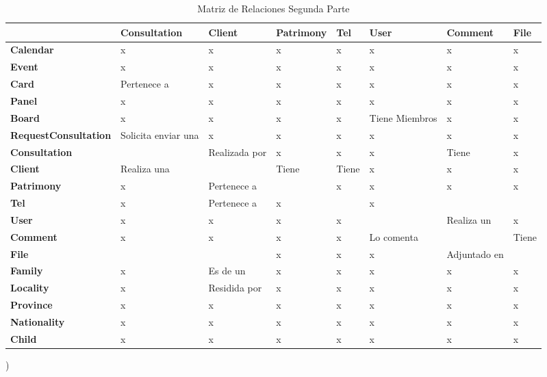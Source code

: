         
\begin{sidewaystable}[p]
    \centering
        \begin{tabular}{|p{4.1cm}|*{7}{>{\raggedright\arraybackslash}p{2.5cm}|}}
         \hline
         & \textbf{Consultation} & \textbf{Client} & \textbf{Patrimony} & \textbf{Tel} & \textbf{User} & \textbf{Comment} & \textbf{File} \\
         \hline
        \textbf{Calendar} & x & x & x & x & x & x & x \\
         \hline
        \textbf{Event} & x & x & x & x & x & x & x \\
         \hline
        \textbf{Card}  & Pertenece a & x & x & x & x & x & x \\
         \hline
        \textbf{Panel}  & x & x & x & x & x & x & x \\
         \hline
        \textbf{Board}  & x & x & x & x & Tiene Miembros & x & x \\
         \hline
        \textbf{RequestConsultation} &  Solicita enviar una & x & x & x & x & x & x \\
         \hline
        \textbf{Consultation} & \cellcolor{gray!25} & Realizada por & x & x & x & Tiene & x \\
         \hline
        \textbf{Client}  & Realiza una & \cellcolor{gray!25} & Tiene & Tiene & x & x & x \\
         \hline
        \textbf{Patrimony}  & x & Pertenece a & \cellcolor{gray!25} & x & x & x & x \\
         \hline
        \textbf{Tel}  & x & Pertenece a & x & \cellcolor{gray!25} & x & &   \\
         \hline
        \textbf{User} & x & x & x & x & \cellcolor{gray!25} & Realiza un & x \\
         \hline
        \textbf{Comment}  & x & x & x & x & Lo comenta & \cellcolor{gray!25} & Tiene \\
         \hline
        \textbf{File}  & & & x & x & x & Adjuntado en & \cellcolor{gray!25}\\
         \hline
        \textbf{Family}  & x & Es de un & x & x & x & x & x \\
         \hline
        \textbf{Locality} & x & Residida por & x & x & x & x & x \\
         \hline
        \textbf{Province} & x & x & x & x & x & x & x \\
         \hline
        \textbf{Nationality} & x & x & x & x & x & x & x \\
         \hline
        \textbf{Child}  & x & x & x & x & x & x & x \\
         \hline
        \end{tabular})
        \caption{Matriz de Relaciones Segunda Parte}
        \label{mat:der2}
        \end{sidewaystable}


